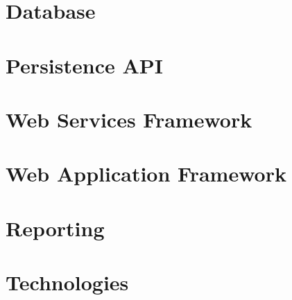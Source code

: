 \documentclass[11pt,a4paper]{article}
\begin{document}
\section{Database}


\section{Persistence API}


\section{Web Services Framework}


\section{Web Application Framework}


\section{Reporting}

	
\section{Technologies}

\end{document}
